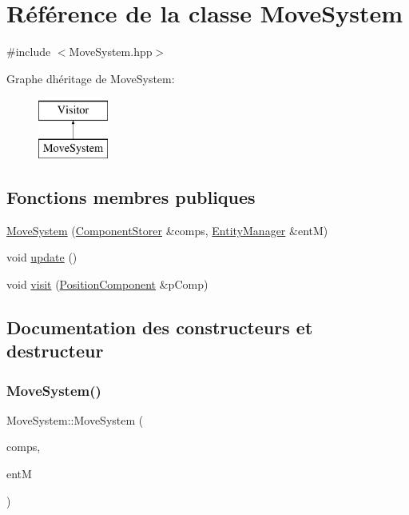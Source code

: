 \hypertarget{classMoveSystem}{}\section{Référence de la classe Move\+System}
\label{classMoveSystem}


{\ttfamily \#include $<$Move\+System.\+hpp$>$}

Graphe d\textquotesingle{}héritage de Move\+System\+:\begin{figure}[H]
\begin{center}
\leavevmode
\includegraphics[height=2.000000cm]{classMoveSystem}
\end{center}
\end{figure}
\subsection*{Fonctions membres publiques}
\begin{DoxyCompactItemize}
\item 
\hyperlink{classMoveSystem_a67dc4e8c619b5f28bf73900d1ea2ab9c}{Move\+System} (\hyperlink{classComponentStorer}{Component\+Storer} \&comps, \hyperlink{classEntityManager}{Entity\+Manager} \&entM)
\item 
void \hyperlink{classMoveSystem_ae2ef74a85abacc1f7d4dd02f74620ed2}{update} ()
\item 
void \hyperlink{classMoveSystem_a816baaf8d8d9db45b4c026902946bc1e}{visit} (\hyperlink{structPositionComponent}{Position\+Component} \&p\+Comp)
\end{DoxyCompactItemize}


\subsection{Documentation des constructeurs et destructeur}
\mbox{\label{classMoveSystem_a67dc4e8c619b5f28bf73900d1ea2ab9c}} 
\subsubsection{\texorpdfstring{Move\+System()}{MoveSystem()}}
{\footnotesize\ttfamily Move\+System\+::\+Move\+System (\begin{DoxyParamCaption}\item[{\hyperlink{classComponentStorer}{Component\+Storer} \&}]{comps,  }\item[{\hyperlink{classEntityManager}{Entity\+Manager} \&}]{entM }\end{DoxyParamCaption})}



